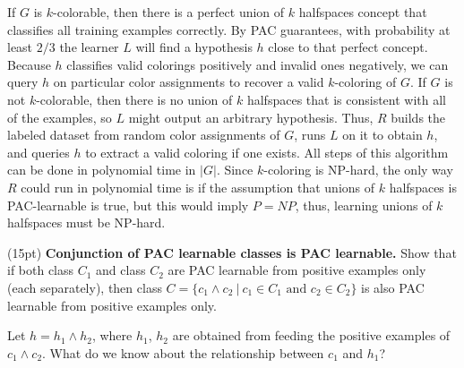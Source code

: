 \documentclass[11pt]{article}
\DeclareMathOperator{\1}{\mathbbm{1}}
\begin{document}
If $G$ is $k$-colorable, then there is a perfect union of $k$ halfspaces concept that classifies all training examples correctly. By PAC guarantees, with probability at least $2/3$ the learner $L$ will find a hypothesis $h$ close to that perfect concept. Because $h$ classifies valid colorings positively and invalid ones negatively, we can query $h$ on particular color assignments to recover a valid $k$-coloring of $G$. If $G$ is not $k$-colorable, then there is no union of $k$ halfspaces that is consistent with all of the examples, so $L$ might output an arbitrary hypothesis. Thus, $R$ builds the labeled dataset from random color assignments of $G$, runs $L$ on it to obtain $h$, and queries $h$ to extract a valid coloring if one exists. All steps of this algorithm can be done in polynomial time in $|G|$. Since $k$-coloring is NP-hard, the only way $R$ could run in polynomial time is if the assumption that unions of $k$ halfspaces is PAC-learnable is true, but this would imply $P=NP$, thus, learning unions of $k$ halfspaces must be NP-hard.



\begin{problem}(15pt) \textbf{Conjunction of PAC learnable classes is PAC learnable.}  
Show that if both class $C_1$ and class $C_2$ are PAC learnable from
positive examples only (each separately), then class $C=\{c_1\wedge c_2\ |\
c_1\in C_1\mbox{ and } c_2\in C_2\}$ is also PAC learnable from positive
examples only.
\end{problem} 
\begin{hint}
Let $h = h_1 \wedge h_2$, where $h_1$, $h_2$ are obtained from feeding the positive 
examples of $c_1\wedge c_2$. What do we know about the relationship between $c_1$
and $h_1$?
\end{hint}


\end{document}
